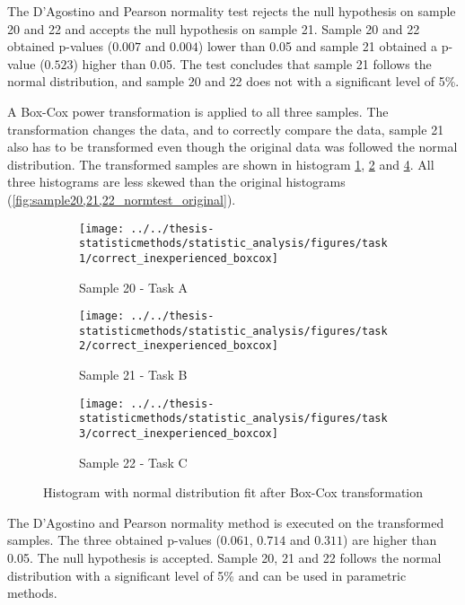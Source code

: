 The D'Agostino and Pearson normality test rejects the null hypothesis on sample 20 and 22 and accepts the null hypothesis on sample 21. Sample 20 and 22 obtained p-values ($0.007$ and $0.004$) lower than 0.05 and sample 21 obtained a p-value ($0.523$) higher than 0.05. The test concludes that sample 21 follows the normal distribution, and sample 20 and 22 does not with a significant level of 5\%. 

A Box-Cox power transformation is applied to all three samples. The transformation changes the data, and to correctly compare the data, sample 21 also has to be transformed even though the original data was followed the normal distribution. The transformed samples are shown in histogram \ref{fig:correctinexperiencedboxcox_task1}, \ref{fig:correctinexperiencedboxcox_task2} and \ref{fig:correctinexperiencedboxcox_task3}. All three histograms are less skewed than the original histograms (\ref{fig:sample20,21,22_normtest_original}).

\begin{figure}[H]
	\centering
	\begin{subfigure}[b]{0.32\textwidth}
		\centering
		\texttt{[image: ../../thesis-statisticmethods/statistic\_analysis/figures/task1/correct\_inexperienced\_boxcox]}
		\caption{Sample 20 - Task A}
		\label{fig:correctinexperiencedboxcox_task1}
	\end{subfigure}
	\begin{subfigure}[b]{0.32\textwidth}
		\centering
		\texttt{[image: ../../thesis-statisticmethods/statistic\_analysis/figures/task2/correct\_inexperienced\_boxcox]}
		\caption{Sample 21 - Task B}
		\label{fig:correctinexperiencedboxcox_task2}
	\end{subfigure}
	\begin{subfigure}[b]{0.32\textwidth}
		\centering
		\texttt{[image: ../../thesis-statisticmethods/statistic\_analysis/figures/task3/correct\_inexperienced\_boxcox]}
		\caption{Sample 22 - Task C}
		\label{fig:correctinexperiencedboxcox_task3}
	\end{subfigure}
	\caption{Histogram with normal distribution fit after Box-Cox transformation}
\end{figure}

The D'Agostino and Pearson normality method is executed on the transformed samples. The three obtained p-values ($0.061$, $0.714$ and $0.311$) are higher than 0.05. The null hypothesis is accepted. Sample 20, 21 and 22 follows the normal distribution with a significant level of 5\% and can be used in parametric methods.  

